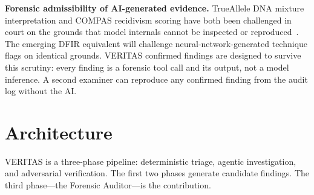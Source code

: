 \documentclass[sigconf, nonacm]{acmart}
\begin{document}
\textbf{Forensic admissibility of AI-generated evidence.}
TrueAllele DNA mixture interpretation and COMPAS recidivism scoring have both
been challenged in court on the grounds that model internals cannot be inspected
or reproduced~\cite{aronson2010}. The emerging DFIR equivalent will challenge
neural-network-generated technique flags on identical grounds. VERITAS confirmed
findings are designed to survive this scrutiny: every finding is a forensic tool
call and its output, not a model inference. A second examiner can reproduce any
confirmed finding from the audit log without the AI.

\section{Architecture}
\label{sec:architecture}

VERITAS is a three-phase pipeline: deterministic triage, agentic investigation,
and adversarial verification. The first two phases generate candidate findings.
The third phase---the Forensic Auditor---is the contribution.
\end{document}

